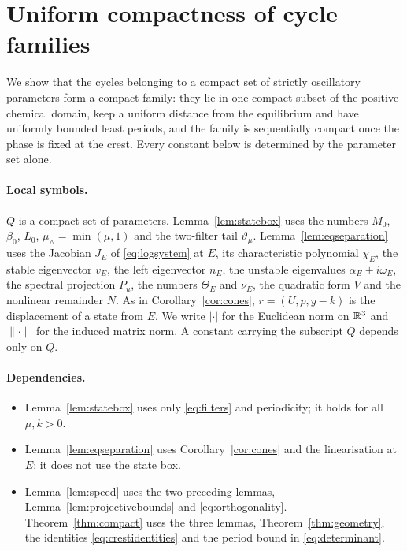 \section{Uniform compactness of cycle families}\label{sec:compact}
We show that the cycles belonging to a compact set of strictly oscillatory parameters form a compact family: they lie in one compact subset of the positive chemical domain, keep a uniform distance from the equilibrium and have uniformly bounded least periods, and the family is sequentially compact once the phase is fixed at the crest. Every constant below is determined by the parameter set alone.

\paragraph{Local symbols.}
$Q$ is a compact set of parameters. Lemma~\ref{lem:statebox} uses the numbers $M_0$, $\beta_0$, $L_0$, $\mu_\wedge=\min(\mu,1)$ and the two-filter tail $\vartheta_\mu$. Lemma~\ref{lem:eqseparation} uses the Jacobian $J_E$ of \eqref{eq:logsystem} at $E$, its characteristic polynomial $\chi_E$, the stable eigenvector $v_E$, the left eigenvector $n_E$, the unstable eigenvalues $\alpha_E\pm i\omega_E$, the spectral projection $P_u$, the numbers $\Theta_E$ and $\nu_E$, the quadratic form $V$ and the nonlinear remainder $N$. As in Corollary~\ref{cor:cones}, $r=(U,p,y-k)$ is the displacement of a state from $E$. We write $|\cdot|$ for the Euclidean norm on $\mathbb R^3$ and $\|\cdot\|$ for the induced matrix norm. A constant carrying the subscript $Q$ depends only on $Q$.

\paragraph{Dependencies.}
\begin{itemize}
\item Lemma~\ref{lem:statebox} uses only \eqref{eq:filters} and periodicity; it holds for all $\mu,k>0$.
\item Lemma~\ref{lem:eqseparation} uses Corollary~\ref{cor:cones} and the linearisation at $E$; it does not use the state box.
\item Lemma~\ref{lem:speed} uses the two preceding lemmas, Lemma~\ref{lem:projectivebounds} and \eqref{eq:orthogonality}. Theorem~\ref{thm:compact} uses the three lemmas, Theorem~\ref{thm:geometry}, the identities \eqref{eq:crestidentities} and the period bound in \eqref{eq:determinant}.
\end{itemize}

